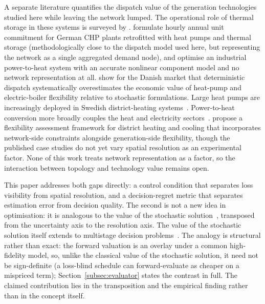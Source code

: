 \documentclass[a4paper,fleqn]{cas-sc}
\begin{document}
A separate literature quantifies the dispatch value of the generation technologies
studied here while leaving the network lumped. The operational role of thermal storage in
these systems is surveyed by \citet{Guelpa2019review}. \citet{Mollenhauer2018} formulate hourly
annual unit commitment for German CHP plants retrofitted with heat pumps and thermal
storage (methodologically close to the dispatch model used here, but representing the
network as a single aggregated demand node), and \citet{Walden2023} optimise an
industrial power-to-heat system with an accurate nonlinear component model and no network
representation at all. \citet{Nielsen2016} show for the Danish market that deterministic
dispatch systematically overestimates the economic value of heat-pump and electric-boiler
flexibility relative to stochastic formulations. Large heat pumps are increasingly deployed
in Swedish district-heating systems~\citep{Averfalk2017}. Power-to-heat conversion more
broadly couples the heat and electricity sectors~\citep{Schweiger2017_p2h}. \citet{Riedl2026} propose a flexibility
assessment framework for district heating and cooling that incorporates network-side
constraints alongside generation-side flexibility, though the published case studies do
not yet vary spatial resolution as an experimental factor. None of this work treats
network representation as a factor, so the interaction between topology and technology
value remains open.

This paper addresses both gaps directly: a control condition that separates loss
visibility from spatial resolution, and a decision-regret metric that separates
estimation error from decision quality. The second is not a new idea in optimisation:
it is analogous to the value of the stochastic solution~\citep{BirgeLouveaux2011}, transposed
from the uncertainty axis to the resolution axis. The value of the stochastic solution itself
extends to multistage decision problems~\citep{Escudero2007VSS}. The analogy is structural rather than exact:
the forward valuation is an overlay under a common high-fidelity model, so, unlike the classical
value of the stochastic solution, it need not be sign-definite (a loss-blind schedule can
forward-evaluate as cheaper on a mispriced term); Section~\ref{subsec:evaluator} states the
contrast in full. The claimed contribution lies in the
transposition and the empirical finding rather than in the concept itself.
\end{document}

